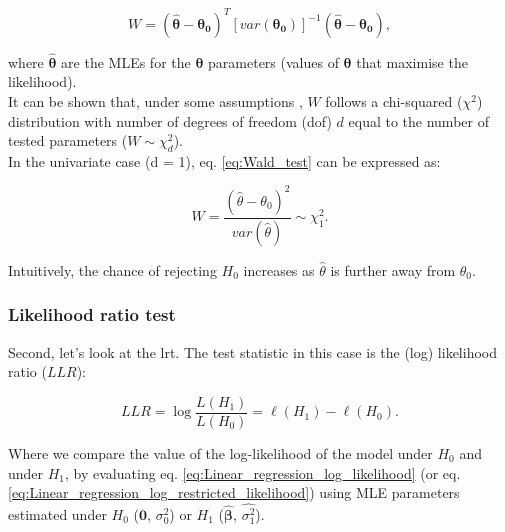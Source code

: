 \begin{equation}\label{eq:Wald_test}
W = (\hat{\boldsymbol{\theta}}-\boldsymbol{\theta_0})^T [var(\boldsymbol{\theta_0})]^{-1}(\hat{\boldsymbol{\theta}}-\boldsymbol{\theta_0}), 
\end{equation}

where $\hat{\boldsymbol{\theta}}$ are the MLEs for the $\boldsymbol{\theta}$ parameters (values of $\boldsymbol{\theta}$ that maximise the likelihood).\\

It can be shown that, under some assumptions \cite{wald1943tests}, $W$ follows a chi-squared ($\chi^2$) distribution with number of degrees of freedom (dof) $d$ equal to the number of tested parameters ($W \sim \chi^2_d $).\\

In the univariate case (d = 1), eq. \eqref{eq:Wald_test} can be expressed as:

\begin{equation}\label{eq:Wald_test_univariate}
    W = \frac{(\hat{\theta}-\theta_0)^2}{var(\hat{\theta})} \sim \chi^2_1.
\end{equation}

Intuitively, the chance of rejecting $H_0$ increases as $\hat{\theta}$ is further away from $\theta_0$.

\newpage

\subsubsection{Likelihood ratio test}

Second, let's look at the \gls{lrt}.
The test statistic in this case is the (log) likelihood ratio ($LLR$):

\begin{equation}\label{eq:log_likelihood_ratio}
LLR = \log \frac{L(H_1)}{L(H_0)} = \ell(H_1) - \ell(H_0). 
\end{equation}

Where we compare the value of the log-likelihood of the model under $H_0$ and under $H_1$, by evaluating eq. \eqref{eq:Linear_regression_log_likelihood} (or eq. \eqref{eq:Linear_regression_log_restricted_likelihood}) using MLE parameters estimated under $H_0$ ($\mathbf{0}$, $\sigma_0^2$) or $H_1$ ($\hat{\boldsymbol{\beta}}$, $\hat{\sigma_1^2}$).  \\

